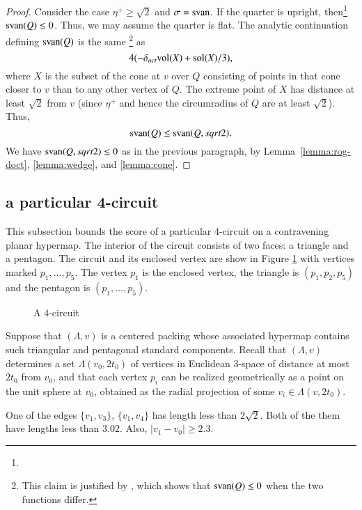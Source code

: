 \begin{proof}
Consider the case $\eta^+\ge\sqrt2$ and $\sigma={\operatorname{svan}}$. If the
quarter is upright, then\footnote{} ${\operatorname{svan}}(Q)\le0$.
Thus, we may assume the quarter is flat.  
The
analytic continuation defining ${\operatorname{svan}}(Q)$ is the same
\footnote{This claim is justified by , which
shows that ${\operatorname{svan}}(Q)\le0$ when the two functions differ.} as
    $$4(-\delta_{oct}{\operatorname{vol}}(X) + \operatorname{sol}(X)/3),$$
where $X$ is the subset of the cone at $v$ over $Q$ consisting of
points in that cone closer to $v$ than to any other vertex of $Q$.
The extreme point of $X$ has distance at least $\sqrt2$ from $v$
(since $\eta^+$ and hence the circumradius of $Q$ are at least
$\sqrt2$).  Thus,
    $${\operatorname{svan}}(Q) \le {\operatorname{svan}}(Q,sqrt2).$$
We have ${\operatorname{svan}}(Q,sqrt2)\le0$ as in the previous paragraph, by
Lemma~\ref{lemma:rog-doct}, \ref{lemma:wedge}, and
\ref{lemma:cone}.
\end{proof}



\subsection{a particular 4-circuit} %

This subsection bounds the score of a particular $4$-circuit on a
contravening planar hypermap.  The interior of the circuit
consists of two faces: a triangle and a pentagon.  The circuit and
its enclosed vertex are show in Figure \ref{fig:no4circuit} with
vertices marked $p_1,\ldots,p_5$.  The vertex $p_1$ is the
enclosed vertex, the triangle is $(p_1,p_2,p_5)$ and the pentagon
is $(p_1,\ldots,p_5)$.

\begin{figure}[htb]
  \centering
  \caption{A $4$-circuit}
  \label{fig:no4circuit}
\end{figure}

Suppose that $(\Lambda,v)$ is a centered packing whose associated hypermap
contains such triangular and pentagonal standard components. Recall
that $(\Lambda,v)$ determines a set $\Lambda(v_0,2t_0)$ of vertices in Euclidean
$3$-space of distance at most $2t_0$ from $v_0$, and that
each vertex $p_i$ can be realized geometrically as a point on the
unit sphere at $v_0$, obtained as the radial projection of
some $v_i\in \Lambda(v,2t_0)$.

\begin{lemma}  
One of the edges $\{v_1,v_3\}$, $\{v_1,v_4\}$ has
length less than $2\sqrt{2}$.  Both of the them have lengths less
than $3.02$. Also, $|v_1-v_0|\ge2.3$.
\end{lemma}

